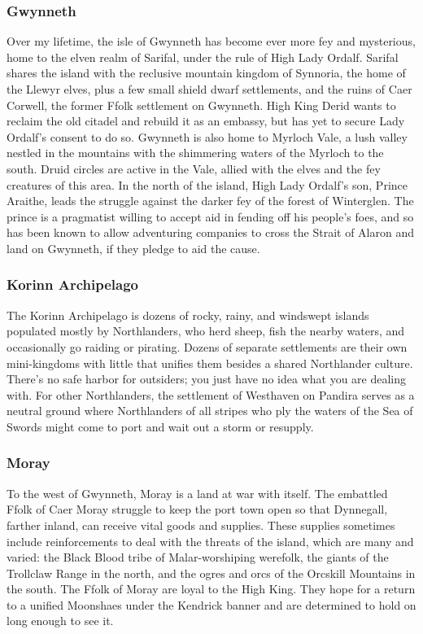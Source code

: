 \documentclass[10pt,a4paper,twoside,twocolumn,openany,bg=print,nodeprecatedcode]{dndbook}
\begin{document}
\subsubsection{Gwynneth}
Over my lifetime, the isle of Gwynneth has become ever more fey and mysterious, home to the elven realm of Sarifal, under the rule of High Lady Ordalf.
Sarifal shares the island with the reclusive mountain kingdom of Synnoria, the home of the Llewyr elves, plus a few small shield dwarf settlements, and the ruins of Caer Corwell, the former Ffolk settlement on Gwynneth. High King Derid wants to reclaim the old citadel and rebuild it as an embassy, but has yet to secure Lady Ordalf's consent to do so.
Gwynneth is also home to Myrloch Vale, a lush valley nestled in the mountains with the shimmering waters of the Myrloch to the south. Druid circles are active in the Vale, allied with the elves and the fey creatures of this area.
In the north of the island, High Lady Ordalf's son, Prince Araithe, leads the struggle against the darker fey of the forest of Winterglen. The prince is a pragmatist willing to accept aid in fending off his people's foes, and so has been known to allow adventuring companies to cross the Strait of Alaron and land on Gwynneth, if they pledge to aid the cause.
\subsubsection{Korinn Archipelago}
The Korinn Archipelago is dozens of rocky, rainy, and windswept islands populated mostly by Northlanders, who herd sheep, fish the nearby waters, and occasionally go raiding or pirating. Dozens of separate settlements are their own mini-kingdoms with little that unifies them besides a shared Northlander culture.
There's no safe harbor for outsiders; you just have no idea what you are dealing with. For other Northlanders, the settlement of Westhaven on Pandira serves as a neutral ground where Northlanders of all stripes who ply the waters of the Sea of Swords might come to port and wait out a storm or resupply.
\subsubsection{Moray}
To the west of Gwynneth, Moray is a land at war with itself. The embattled Ffolk of Caer Moray struggle to keep the port town open so that Dynnegall, farther inland, can receive vital goods and supplies.
These supplies sometimes include reinforcements to deal with the threats of the island, which are many and varied: the Black Blood tribe of Malar-worshiping werefolk, the giants of the Trollclaw Range in the north, and the ogres and orcs of the Orcskill Mountains in the south.
The Ffolk of Moray are loyal to the High King. They hope for a return to a unified Moonshaes under the Kendrick banner and are determined to hold on long enough to see it.
\end{document}

